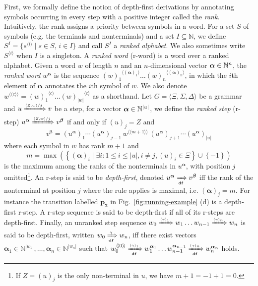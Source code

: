 \documentclass[final]{llncs}
\newcommand{\Arrow}[1]{\xRightarrow{{\scriptscriptstyle #1}}}
\newcommand{\xArrow}[2]{\xRightarrow[{\scriptscriptstyle #2}]{{\scriptscriptstyle #1}}}
\newcommand{\nat}{{\bf \mathbb{N}}}
\def\set#1{{\left\{ #1 \right\}}}
\def\tuple#1{{\langle #1 \rangle}}
\def\nats{{\mathbb{N}}}
\def\len#1{{\vert{#1}\vert}}
\def\prod{\Delta}
\def\Vars{\ensuremath{\Xi}}
\def\rank#1{\langle\!\langle#1\rangle\!\rangle}
\begin{document}
First, we formally define the notion of depth-first derivations by annotating
symbols occurring in every step with a positive integer called the \emph{rank}.
Intuitively, the rank assigns a priority between symbols in a word.
For a set \(S\) of symbols (e.g. the terminals and nonterminals) and a set \(I \subseteq \nats\),
we define \(S^{I} = \{ s^{\tuple{i}} \mid s\in S,\, i\in I\}\) and call
\(S^{I}\) a \emph{ranked alphabet}. We also sometimes write \(S^{\tuple{i}}\)
when \(I\) is a singleton. 
A \emph{ranked word} (r-word) is a word over a ranked alphabet.
Given a word \(w\) of length \(n\) and an \(n\)-dimensional
vector \(\boldsymbol{\alpha}\in\nat^n\), the \emph{ranked
word} \(w^{\boldsymbol{\alpha}}\) is the sequence
\({(w)_1}^{\tuple{(\boldsymbol{\alpha})_1}}\ldots {(w)_n}^{\tuple{(\boldsymbol{\alpha})_n}}\), 
in which the \(i\)th element of \(\boldsymbol{\alpha}\) annotates the \(i\)th symbol of \(w\). We also denote \(w^{ \rank{c} } =
{(w)_1}^{\tuple{c}} \ldots {(w)_{\len{w}}}^{\tuple{c}}\) as a
shorthand.
Let $G = \tuple{\Vars,\Sigma,\prod}$ be a grammar
and \(u
\Arrow{(Z,w)/j} v\) be a step, for a vector 
\(\boldsymbol{\alpha}\in\nat^{\len{u}}\), we define the \emph{ranked step} (r-step)
\(u^{\boldsymbol{\alpha}} \Arrow{(Z,w)/j} v^{\boldsymbol{\beta}}\) if and only if
\((u)_j = Z\) and 
\[v^{\boldsymbol{\beta}} = (u^{\boldsymbol{\alpha}})_1 \cdots
(u^{\boldsymbol{\alpha}})_{j-1} \, w^{\rank{m+1}} \,
(u^{\boldsymbol{\alpha}})_{j+1}\cdots
(u^{\boldsymbol{\alpha}})_{\len{u}} \] where each symbol in \(w\) has
rank \(m+1\) and 
\[m = \max\left(\set{
(\boldsymbol{\alpha})_i \mid \exists i\colon 1 \leq i \leq \len{u},
i\neq j, (u)_i \in \Vars} \cup \set{-1} \right)\] is the maximum among
the ranks of the nonterminals in \(u^{\boldsymbol{\alpha}}\), with
position \(j\) omitted\footnote{If $Z=(u)_j$ is the only non-terminal
in $u$, we have $m+1=-1+1=0$.}. An r-step is said to
be \emph{depth-first},
denoted \(u^{\boldsymbol{\alpha}} \xArrow{}{\textbf{df}}
v^{\boldsymbol{\beta}}\) if{}f the rank of the nonterminal at
position \(j\) where the rule applies is maximal,
i.e. $(\boldsymbol{\alpha})_j=m$.  For instance the transition
labelled \(\mathbf{p_2}\) in Fig.~\ref{fig:running-example} (d) is a
depth-first r-step.  A r-step sequence is said to be depth-first if
all of its r-steps are depth-first. Finally, an unranked step
sequence \(w_0 \Arrow{(\gamma)_1} w_1
\ldots w_{n-1} \Arrow{(\gamma)_{n}} w_n\)
is said to be depth-first,
written \(w_0 \xArrow{\gamma}{\mathbf{df}} w_n\), if{}f there exist
vectors \(\boldsymbol{\alpha}_1 \in \nats^{\len{w_1}}, \ldots,
\boldsymbol{\alpha}_n \in \nats^{\len{w_n}}\) such that 
\(w_0^{\rank{0}} \xArrow{(\gamma)_1}{\mathbf{df}}
w_1^{\boldsymbol{\alpha}_1} \ldots w_{n-1}^{\boldsymbol{\alpha}_{n-1}} 
\xArrow{(\gamma)_{n}}{\mathbf{df}} w_{n}^{\boldsymbol{\alpha}_{n}}\) holds.
\end{document}
